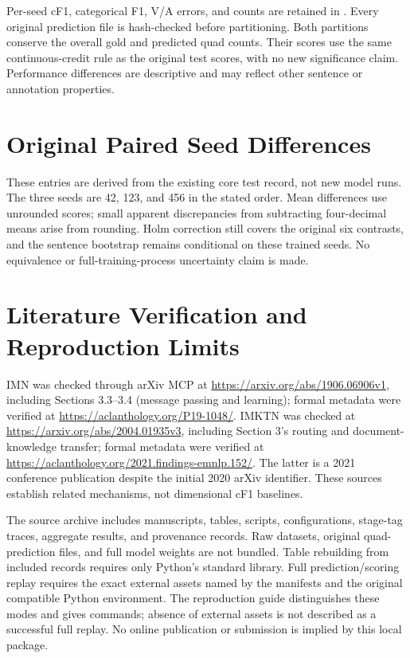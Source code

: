 \documentclass[10pt]{article}
\begin{document}

Per-seed cF1, categorical F1, V/A errors, and counts are retained in . Every original prediction file is hash-checked before partitioning. Both partitions conserve the overall gold and predicted quad counts. Their scores use the same continuous-credit rule as the original test scores, with no new significance claim. Performance differences are descriptive and may reflect other sentence or annotation properties.

\section{Original Paired Seed Differences}

These entries are derived from the existing core test record, not new model runs. The three seeds are 42, 123, and 456 in the stated order. Mean differences use unrounded scores; small apparent discrepancies from subtracting four-decimal means arise from rounding. Holm correction still covers the original six contrasts, and the sentence bootstrap remains conditional on these trained seeds. No equivalence or full-training-process uncertainty claim is made.

\section{Literature Verification and Reproduction Limits}
IMN was checked through arXiv MCP at \url{https://arxiv.org/abs/1906.06906v1}, including Sections 3.3--3.4 (message passing and learning); formal metadata were verified at \url{https://aclanthology.org/P19-1048/}. IMKTN was checked at \url{https://arxiv.org/abs/2004.01935v3}, including Section 3's routing and document-knowledge transfer; formal metadata were verified at \url{https://aclanthology.org/2021.findings-emnlp.152/}. The latter is a 2021 conference publication despite the initial 2020 arXiv identifier. These sources establish related mechanisms, not dimensional cF1 baselines.

The source archive includes manuscripts, tables, scripts, configurations, stage-tag traces, aggregate results, and provenance records. Raw datasets, original quad-prediction files, and full model weights are not bundled. Table rebuilding from included records requires only Python's standard library. Full prediction/scoring replay requires the exact external assets named by the manifests and the original compatible Python environment. The reproduction guide distinguishes these modes and gives commands; absence of external assets is not described as a successful full replay. No online publication or submission is implied by this local package.
\end{document}
